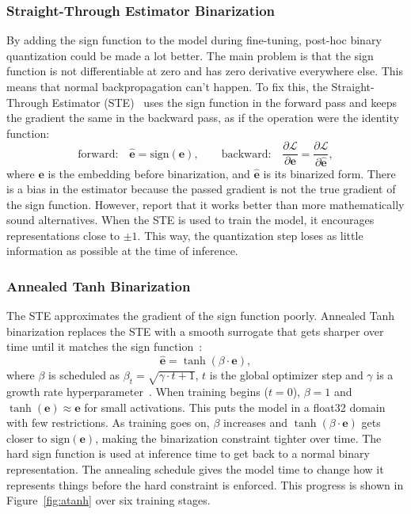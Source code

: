 \subsubsection{Straight-Through Estimator Binarization}

By adding the sign function to the model during fine-tuning, post-hoc binary quantization could be made a lot better. The main problem is that the sign function is not differentiable at zero and has zero derivative everywhere else. This means that normal backpropagation can't happen. To fix this, the Straight-Through Estimator (STE)~\cite{bengio2013estimating} uses the sign function in the forward pass and keeps the gradient the same in the backward pass, as if the operation were the identity function:
%
\begin{equation}
  \text{forward:} \quad \hat{\mathbf{e}} = \text{sign}(\mathbf{e}), \qquad \text{backward:} \quad \frac{\partial \mathcal{L}}{\partial \mathbf{e}} = \frac{\partial \mathcal{L}}{\partial \hat{\mathbf{e}}},
\end{equation}
%
where $\mathbf{e}$ is the embedding before binarization, and $\hat{\mathbf{e}}$ is its binarized form. There is a bias in the estimator because the passed gradient is not the true gradient of the sign function. However, \citeauthor{bengio2013estimating} report that it works better than more mathematically sound alternatives. When the STE is used to train the model, it encourages representations close to $\pm 1$. This way, the quantization step loses as little information as possible at the time of inference.

\subsubsection{Annealed Tanh Binarization}

The STE approximates the gradient of the sign function poorly. Annealed Tanh binarization replaces the STE with a smooth surrogate that gets sharper over time until it matches the sign function~\cite{cao2017hashnet}:
%
\begin{equation}
  \hat{\mathbf{e}} = \tanh(\beta \cdot \mathbf{e}),
\end{equation}
%
where $\beta$ is scheduled as $\beta_t = \sqrt{\gamma \cdot t + 1}$, $t$ is the global optimizer step and $\gamma$ is a growth rate hyperparameter~\cite{yamada2021efficient}. When training begins ($t = 0$), $\beta = 1$ and $\tanh(\mathbf{e}) \approx \mathbf{e}$ for small activations. This puts the model in a float32 domain with few restrictions. As training goes on, $\beta$ increases and $\tanh(\beta \cdot \mathbf{e})$ gets closer to $\text{sign}(\mathbf{e})$, making the binarization constraint tighter over time. The hard sign function is used at inference time to get back to a normal binary representation. The annealing schedule gives the model time to change how it represents things before the hard constraint is enforced. This progress is shown in Figure~\ref{fig:atanh} over six training stages.

